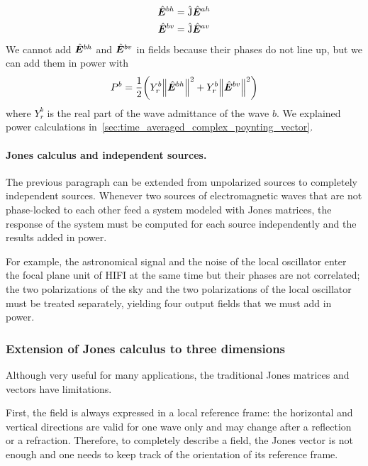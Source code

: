 \begin{equation}
    \begin{aligned}
        \hat{\bm{E}}^{bh}
        &=
        \hat{\mathrm{J}}
        \hat{\bm{E}}^{ah}
        \\
        \hat{\bm{E}}^{bv}
        &=
        \hat{\mathrm{J}}
        \hat{\bm{E}}^{av}
    \end{aligned}
\end{equation}
We cannot add $\hat{\bm{E}}^{bh}$ and $\hat{\bm{E}}^{bv}$ in fields because their phases do not line up, but we can add them in power with
\begin{equation}
    P^b
    =
    \frac{1}{2}
    \left(
        Y^b_r \norm{\vectcp{E}^{bh}}^2 + Y^b_r \norm{\vectcp{E}^{bv}}^2
    \right)
\end{equation}
where $Y^b_r$ is the real part of the wave admittance of the wave $b$.
We explained power calculations in~\cref{sec:time_averaged_complex_poynting_vector}.

\paragraph{Jones calculus and independent sources.}
\label{sec:jones_independent}
The previous paragraph can be extended from unpolarized sources to completely independent sources.
Whenever two sources of electromagnetic waves that are not phase-locked to each other feed a system modeled with Jones matrices, the response of the system must be computed for each source independently and the results added in power.

For example, the astronomical signal and the noise of the local oscillator enter the focal plane unit of HIFI at the same time but their phases are not correlated;
the two polarizations of the sky and the two polarizations of the local oscillator must be treated separately, yielding four output fields that we must add in power.




\subsubsection{Extension of Jones calculus to three dimensions}
Although very useful for many applications, the traditional Jones matrices and vectors have limitations.

First, the field is always expressed in a local reference frame: the horizontal and vertical directions are valid for one wave only and may change after a reflection or a refraction.
Therefore, to completely describe a field, the Jones vector is not enough and one needs to keep track of the orientation of its reference frame.

